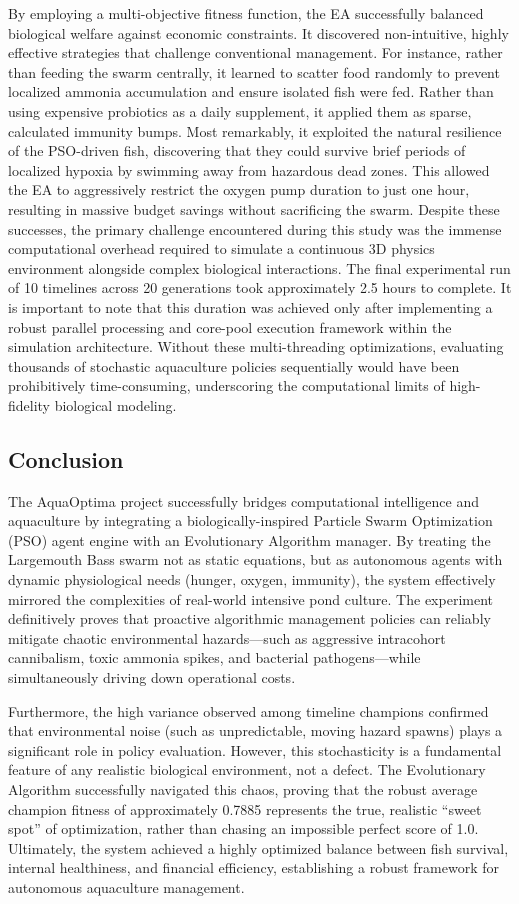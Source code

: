 \documentclass[conference]{IEEEtran}
\begin{document}
By employing a multi-objective fitness function, the EA successfully balanced biological welfare against economic constraints. It discovered non-intuitive, highly effective strategies that challenge conventional management. For instance, rather than feeding the swarm centrally, it learned to scatter food randomly to prevent localized ammonia accumulation and ensure isolated fish were fed. Rather than using expensive probiotics as a daily supplement, it applied them as sparse, calculated immunity bumps. Most remarkably, it exploited the natural resilience of the PSO-driven fish, discovering that they could survive brief periods of localized hypoxia by swimming away from hazardous dead zones. This allowed the EA to aggressively restrict the oxygen pump duration to just one hour, resulting in massive budget savings without sacrificing the swarm. Despite these successes, the primary challenge encountered during this study was the immense computational overhead required to simulate a continuous 3D physics environment alongside complex biological interactions. The final experimental run of 10 timelines across 20 generations took approximately 2.5 hours to complete. It is important to note that this duration was achieved only after implementing a robust parallel processing and core-pool execution framework within the simulation architecture. Without these multi-threading optimizations, evaluating thousands of stochastic aquaculture policies sequentially would have been prohibitively time-consuming, underscoring the computational limits of high-fidelity biological modeling.

\subsection{Conclusion}
The AquaOptima project successfully bridges computational intelligence and aquaculture by integrating a biologically-inspired Particle Swarm Optimization (PSO) agent engine with an Evolutionary Algorithm manager. By treating the Largemouth Bass swarm not as static equations, but as autonomous agents with dynamic physiological needs (hunger, oxygen, immunity), the system effectively mirrored the complexities of real-world intensive pond culture. The experiment definitively proves that proactive algorithmic management policies can reliably mitigate chaotic environmental hazards---such as aggressive intracohort cannibalism, toxic ammonia spikes, and bacterial pathogens---while simultaneously driving down operational costs. 

Furthermore, the high variance observed among timeline champions confirmed that environmental noise (such as unpredictable, moving hazard spawns) plays a significant role in policy evaluation. However, this stochasticity is a fundamental feature of any realistic biological environment, not a defect. The Evolutionary Algorithm successfully navigated this chaos, proving that the robust average champion fitness of approximately 0.7885 represents the true, realistic ``sweet spot'' of optimization, rather than chasing an impossible perfect score of 1.0. Ultimately, the system achieved a highly optimized balance between fish survival, internal healthiness, and financial efficiency, establishing a robust framework for autonomous aquaculture management.
\end{document}
